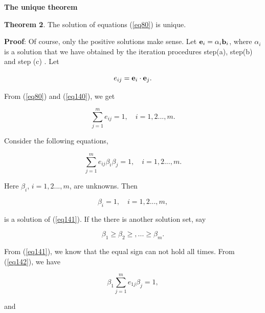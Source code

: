 \documentclass [18pt]{article}
\begin{document}
\textbf{The unique theorem}

\textbf{Theorem 2}. The solution of equations (\ref{eq80}) is unique.

\textbf{Proof}: Of course, only the positive solutions make sense. Let ${\rm
{\bf e}}_i = \alpha _i {\rm {\bf b}}_i $, where $\alpha _i $ is a solution
that we have obtained by the iteration procedures step(a), step(b) and step
(c) . Let


\begin{equation}
\label{eq140}
e_{ij} = {\rm {\bf e}}_i \cdot {\rm {\bf e}}_j .
\end{equation}



From (\ref{eq80}) and (\ref{eq140}), we get


\begin{equation}
\label{eq141}
\sum\limits_{j = 1}^m {e_{ij} = 1} ,
\quad
i = 1,2...,m.
\end{equation}



Consider the following equations,


\begin{equation}
\label{eq142}
\sum\limits_{j = 1}^m {e_{ij} \beta _i \beta _j = 1} ,
\quad
i = 1,2...,m.
\end{equation}



Here $\beta _i $, $i = 1,2...,m$, are unknowns. Then


\begin{equation}
\label{eq143}
\beta _i = 1,
\quad
i = 1,2...,m,
\end{equation}



\noindent
is a solution of (\ref{eq141}). If the there is another solution set, say


\begin{equation}
\label{eq144}
\beta _1 \ge \beta _2 \ge ,... \ge \beta _m .
\end{equation}



From (\ref{eq141}), we know that the equal sign can not hold all times. From (\ref{eq142}),
we have


\begin{equation}
\label{eq145}
\beta _1 \sum\limits_{j = 1}^m {e_{1j} \beta _j = 1} ,
\end{equation}



\noindent
and
\end{document}
